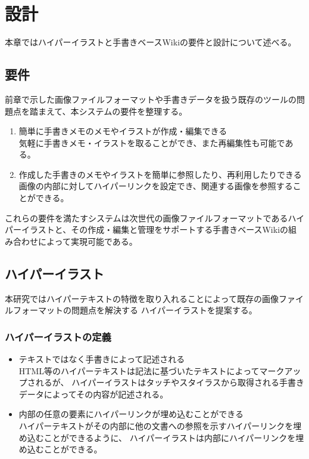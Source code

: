 \chapter{設計}
\label{chap:sekkei}

本章ではハイパーイラストと手書きベースWikiの要件と設計について述べる。

\newpage

\section{要件}
前章で示した画像ファイルフォーマットや手書きデータを扱う既存のツールの問題点を踏まえて、本システムの要件を整理する。
\begin{enumerate}
    \item 簡単に手書きメモのメモやイラストが作成・編集できる\\
    気軽に手書きメモ・イラストを取ることができ、また再編集性も可能である。
    \item 作成した手書きのメモやイラストを簡単に参照したり、再利用したりできる\\
    画像の内部に対してハイパーリンクを設定でき、関連する画像を参照することができる。
\end{enumerate}
これらの要件を満たすシステムは次世代の画像ファイルフォーマットであるハイパーイラストと、その作成・編集と管理をサポートする手書きベースWikiの組み合わせによって実現可能である。

\section{ハイパーイラスト}
本研究ではハイパーテキストの特徴を取り入れることによって既存の画像ファイルフォーマットの問題点を解決する
ハイパーイラストを提案する。

\subsection{ハイパーイラストの定義}
\begin{itemize}
    \item テキストではなく手書きによって記述される \\
    HTML等のハイパーテキストは記法に基づいたテキストによってマークアップされるが、
    ハイパーイラストはタッチやスタイラスから取得される手書きデータによってその内容が記述される。
    \item 内部の任意の要素にハイパーリンクが埋め込むことができる \\
    ハイパーテキストがその内部に他の文書への参照を示すハイパーリンクを埋め込むことができるように、
    ハイパーイラストは内部にハイパーリンクを埋め込むことができる。
\end{itemize}


